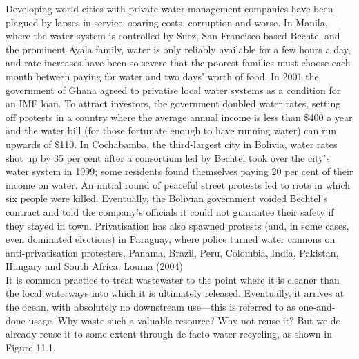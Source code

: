 \documentclass{article}
\begin{document}
Developing world cities with private water-management companies have been plagued by lapses in service, soaring costs, corruption and worse. In Manila, where the water system is controlled by Suez, San Francisco-based Bechtel and the prominent Ayala family, water is only reliably available for a few hours a day, and rate increases have been so severe that the poorest families must choose each month between paying for water and two days’ worth of food. In 2001 the government of Ghana agreed to privatise local water systems as a condition for an IMF loan. To attract investors, the government doubled water rates, setting off protests in a country where the average annual income is less than \$400 a year and the water bill (for those fortunate enough to have running water) can run upwards of \$110. In Cochabamba, the third-largest city in Bolivia, water rates shot up by 35 per cent after a consortium led by Bechtel took over the city’s water system in 1999; some residents found themselves paying 20 per cent of their income on water. An initial round of peaceful street protests led to riots in which six people were killed. Eventually, the Bolivian government voided Bechtel’s contract and told the company’s officials it could not guarantee their safety if they stayed in town. Privatisation has also spawned protests (and, in some cases, even dominated elections) in Paraguay, where police turned water cannons on anti-privatisation protesters, Panama, Brazil, Peru, Colombia, India, Pakistan, Hungary and South Africa.
Louma (2004)\\

It is common practice to treat wastewater to the point where it is cleaner than the local waterways into which it is ultimately released. Eventually, it arrives at the ocean, with absolutely no downstream use—this is referred to as one-and-done usage. Why waste such a valuable resource? Why not reuse it? But we do already reuse it to some extent through de facto water recycling, as shown in Figure 11.1.\\
\end{document}

